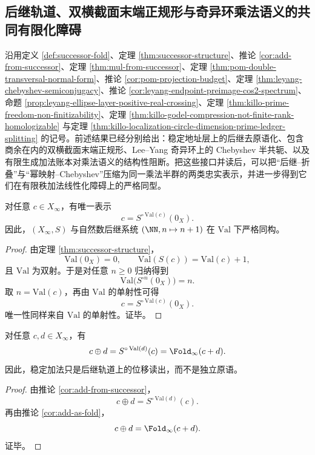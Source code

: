 \subsection{后继轨道、双横截面末端正规形与奇异环乘法语义的共同有限化障碍}\label{subsec:conclusion-successor-semiconjugacy-ledger-obstruction}
沿用定义 \ref{def:successor-fold}、定理 \ref{thm:successor-structure}、推论 \ref{cor:add-from-successor}、定理 \ref{thm:mul-from-successor}、定理 \ref{thm:pom-double-transversal-normal-form}、推论 \ref{cor:pom-projection-budget}、定理 \ref{thm:leyang-chebyshev-semiconjugacy}、推论 \ref{cor:leyang-endpoint-preimage-cos2-spectrum}、命题 \ref{prop:leyang-ellipse-layer-positive-real-crossing}、定理 \ref{thm:killo-prime-freedom-non-finitizability}、定理 \ref{thm:killo-godel-compression-not-finite-rank-homologizable} 与定理 \ref{thm:killo-localization-circle-dimension-prime-ledger-splitting} 的记号。前述结果已经分别给出：稳定地址层上的后继去原语化、包含商余在内的双横截面末端正规形、Lee--Yang 奇异环上的 Chebyshev 半共轭、以及有限生成加法账本对乘法语义的结构性阻断。把这些接口并读后，可以把“后继--折叠”与“幂映射--Chebyshev”压缩为同一乘法半群的两类忠实表示，并进一步得到它们在有限秩加法线性化障碍上的严格同型。

\begin{theorem}[稳定地址层的后继轨道正规形]\label{thm:conclusion-stable-successor-orbit-normal-form}
对任意 \(c\in X_\infty\)，有唯一表示
\[
c=S^{\circ\,\mathrm{Val}(c)}(0_X).
\]
因此，\((X_\infty,S)\) 与自然数后继系统 \((\NN,n\mapsto n+1)\) 在 \(\mathrm{Val}\) 下严格同构。
\end{theorem}
\begin{proof}
由定理 \ref{thm:successor-structure}，
\[
\mathrm{Val}(0_X)=0,\qquad
\mathrm{Val}(S(c))=\mathrm{Val}(c)+1,
\]
且 \(\mathrm{Val}\) 为双射。于是对任意 \(n\ge 0\) 归纳得到
\[
\mathrm{Val}\bigl(S^{\circ n}(0_X)\bigr)=n.
\]
取 \(n=\mathrm{Val}(c)\)，再由 \(\mathrm{Val}\) 的单射性可得
\[
c=S^{\circ\,\mathrm{Val}(c)}(0_X).
\]
唯一性同样来自 \(\mathrm{Val}\) 的单射性。证毕。
\end{proof}

\begin{corollary}[加法作为同一后继轨道上的平移读出]\label{cor:conclusion-stable-successor-translation-addition}
对任意 \(c,d\in X_\infty\)，有
\[
c\oplus d=S^{\circ\,\mathrm{Val}(d)}(c)=\Fold_\infty(c+d).
\]
因此，稳定加法只是后继轨道上的位移读出，而不是独立原语。
\end{corollary}
\begin{proof}
由推论 \ref{cor:add-from-successor}，
\[
c\oplus d=S^{\circ\,\mathrm{Val}(d)}(c).
\]
再由推论 \ref{cor:add-as-fold}，
\[
c\oplus d=\Fold_\infty(c+d).
\]
证毕。
\end{proof}

